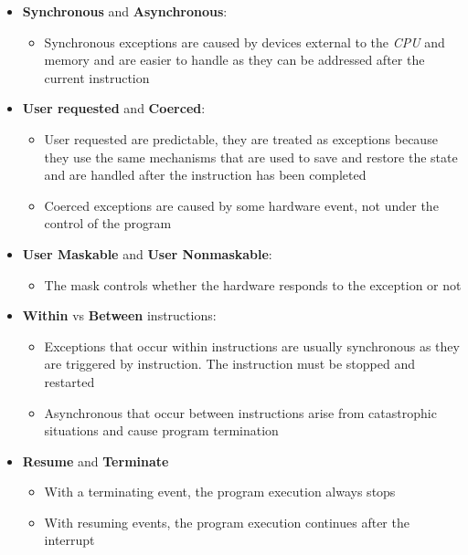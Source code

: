 \documentclass[english]{article}
\begin{document}
\begin{itemize}
  \item \textbf{Synchronous} and \textbf{Asynchronous}:
        \begin{itemize}
          \item Synchronous exceptions are caused by devices external to the \textit{CPU} and memory and are easier to handle as they can be addressed after the current instruction
        \end{itemize}
  \item \textbf{User requested} and \textbf{Coerced}:
        \begin{itemize}
          \item User requested are predictable, they are treated as exceptions because they use the same mechanisms that are used to save and restore the state and are handled after the instruction has been completed
          \item Coerced exceptions are caused by some hardware event, not under the control of the program
        \end{itemize}
  \item \textbf{User Maskable} and \textbf{User Nonmaskable}:
        \begin{itemize}
          \item The mask controls whether the hardware responds to the exception or not
        \end{itemize}
  \item \textbf{Within} vs \textbf{Between} instructions:
        \begin{itemize}
          \item Exceptions that occur within instructions are usually synchronous as they are triggered by instruction. The instruction must be stopped and restarted
          \item Asynchronous that occur between instructions arise from catastrophic situations and cause program termination
        \end{itemize}
  \item \textbf{Resume} and \textbf{Terminate}
        \begin{itemize}
          \item With a terminating event, the program execution always stops
          \item With resuming events, the program execution continues after the interrupt
        \end{itemize}
\end{itemize}
\end{document}
